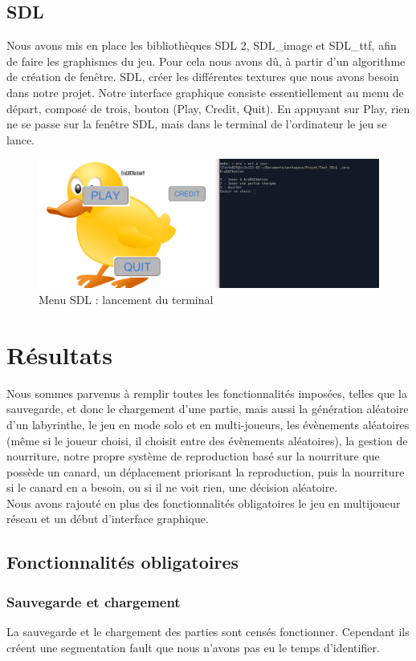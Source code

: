 \documentclass[12pt,a4paper,twoside]{article}
\begin{document}
\subsection{SDL}
Nous avons mis en place les bibliothèques SDL 2, SDL\_image et SDL\_ttf, afin de faire les 
graphismes du jeu. Pour cela nous avons dû, à partir d’un algorithme de création de fenêtre.
SDL, créer les différentes textures que nous avons besoin dans notre projet.
Notre interface graphique consiste essentiellement au menu de départ, composé de trois, bouton (Play, Credit, Quit).
En appuyant sur Play, rien ne se passe sur la fenêtre SDL, mais dans le terminal de l’ordinateur le jeu se lance.\\
\begin{figure}[h]
\centering
\includegraphics[width=1\textwidth]{IMG/jeu.png}
\caption{Menu SDL : lancement du terminal}
\end{figure}
\newpage
\section{Résultats}
    Nous sommes parvenus à remplir toutes les fonctionnalités imposées,
telles que la sauvegarde, et donc le chargement d’une partie, mais aussi la
génération aléatoire d'un labyrinthe, le jeu en mode solo et en multi-joueurs,
les évènements aléatoires (même si le joueur choisi, il choisit entre des
évènements aléatoires), la gestion de nourriture, notre propre système de
reproduction basé sur la nourriture que possède un canard, un déplacement priorisant
la reproduction, puis la nourriture si le canard en a besoin, ou si il ne voit rien,
une décision aléatoire.
\\Nous avons rajouté en plus des fonctionnalités obligatoires le jeu en multijoueur réseau et un début d’interface graphique. 
\subsection{Fonctionnalités obligatoires}
\subsubsection{Sauvegarde et chargement}
    La sauvegarde et le chargement des parties sont censés fonctionner. Cependant ils créent une segmentation fault que nous n’avons pas eu le temps d’identifier. 
\end{document}
